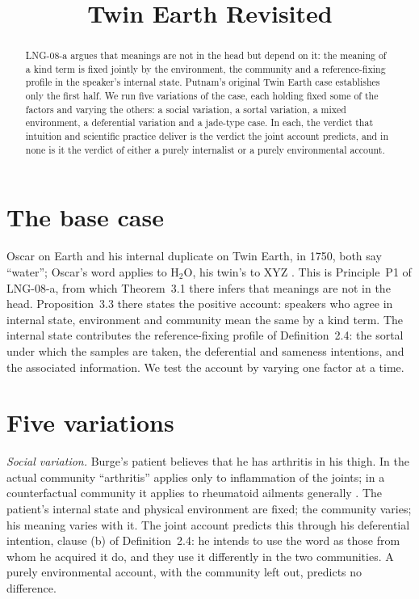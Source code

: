 \documentclass{situationist-preprint}
\title{Twin Earth Revisited}
\begin{document}
\maketitle

\begin{abstract}
LNG-08-a argues that meanings are not in the head but depend on it: the meaning of a kind term is fixed jointly by the environment, the community and a reference-fixing profile in the speaker's internal state. Putnam's original Twin Earth case establishes only the first half. We run five variations of the case, each holding fixed some of the factors and varying the others: a social variation, a sortal variation, a mixed environment, a deferential variation and a jade-type case. In each, the verdict that intuition and scientific practice deliver is the verdict the joint account predicts, and in none is it the verdict of either a purely internalist or a purely environmental account.
\end{abstract}

\section{The base case}

Oscar on Earth and his internal duplicate on Twin Earth, in 1750, both say \enquote{water}; Oscar's word applies to H$_2$O, his twin's to XYZ \citep{Putnam1975}. This is Principle~P1 of LNG-08-a, from which Theorem~3.1 there infers that meanings are not in the head. Proposition~3.3 there states the positive account: speakers who agree in internal state, environment and community mean the same by a kind term. The internal state contributes the reference-fixing profile of Definition~2.4: the sortal under which the samples are taken, the deferential and sameness intentions, and the associated information. We test the account by varying one factor at a time.

\section{Five variations}

\emph{Social variation.} Burge's patient believes that he has arthritis in his thigh. In the actual community \enquote{arthritis} applies only to inflammation of the joints; in a counterfactual community it applies to rheumatoid ailments generally \citep{Burge1979}. The patient's internal state and physical environment are fixed; the community varies; his meaning varies with it. The joint account predicts this through his deferential intention, clause (b) of Definition~2.4: he intends to use the word as those from whom he acquired it do, and they use it differently in the two communities. A purely environmental account, with the community left out, predicts no difference.
\end{document}
